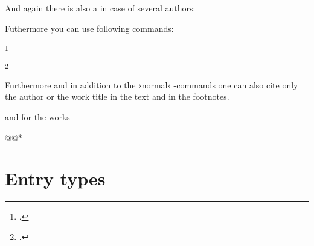 \documentclass[a4paper,
10pt,
ngerman,
english
]{ltxdoc}
\begin{document}
\DescribeMacro{\textcites}
And again there is also a  in case of several authors: 



Futhermore you can use following  commands:
\DescribeMacro{\footcite} 

\begin{example}
\footcite{Schlegel1992}
\end{example}


\DescribeMacro{\footcitetext} 

\begin{example}
\footcitetext{Schlegel1992}
\end{example}


\DescribeMacro{\smartcite} 

\begin{example}
\smartcite{Schlegel1992}
\end{example}






\DescribeMacro{\citeauthor}\DescribeMacro{\citetitle}\label{citeauthor}%
Furthermore and in addition to the ›normal‹ -commands one can also cite only the author or the work title in the text and in the footnotes.
  and for the works 
\begin{code}
\citetitle*@@*
\end{code} 

\section{Entry types}
\end{document}
